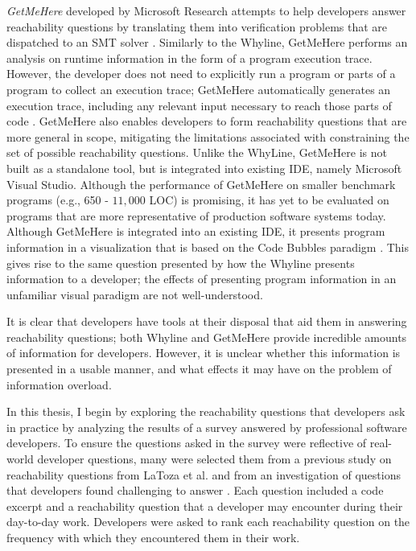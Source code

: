 \emph{GetMeHere} developed by Microsoft Research attempts to help developers 
answer reachability questions by translating them into verification problems
that are dispatched to an \ac{SMT} solver \cite{barnett-2014-get}.
Similarly to the Whyline, GetMeHere performs an analysis on runtime information
in the form of a program execution trace.
However, the developer does not need to explicitly run a program or parts of a 
program to collect an execution trace; GetMeHere automatically generates an 
execution trace, including any relevant input necessary to reach those parts of 
code \cite{barnett-2014-get}.
GetMeHere also enables developers to form reachability questions that are more
general in scope, mitigating the limitations associated with constraining
the set of possible reachability questions.
Unlike the WhyLine, GetMeHere is not built as a standalone tool, but is
integrated into existing \ac{IDE}, namely Microsoft Visual Studio.
Although the performance of GetMeHere on smaller benchmark programs (e.g.,
650 - $11,000$ LOC) is promising, it has yet to be evaluated on programs that 
are more representative of production software systems today.
Although GetMeHere is integrated into an existing \ac{IDE}, it presents program
information in a visualization that is based on the Code Bubbles paradigm
\cite{barnett-2014-get, bragdon-2010-code-bubbles}.
This gives rise to the same question presented by how the Whyline presents
information to a developer; the effects of presenting program information in
an unfamiliar visual paradigm are not well-understood.

\par It is clear that developers have tools at their disposal that aid them in
answering reachability questions; both Whyline and GetMeHere provide incredible 
amounts of information for developers.
However, it is unclear whether this information is presented in a usable
manner, and what effects it may have on the problem of information overload.

\par In this thesis, I begin by exploring the reachability questions that
developers ask in practice by analyzing the results of a survey answered
by \numparticipants{} professional software developers.
To ensure the questions asked in the survey were reflective of real-world
developer questions, many were selected them from a previous study on 
reachability questions from LaToza et al. \cite{latoza-2010-reach} and from an
investigation of questions that developers found challenging to answer
\cite{latoza-2010-hard-questions}.
Each question included a code excerpt and a reachability question that a
developer may encounter during their day-to-day work.
Developers were asked to rank each reachability question on the frequency with 
which they encountered them in their work.

